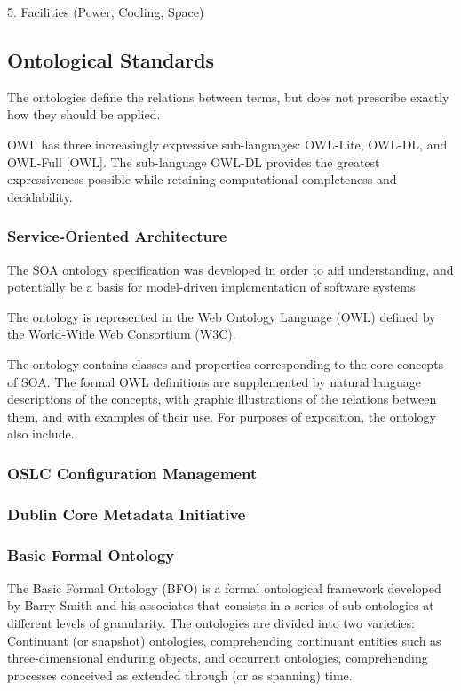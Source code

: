 5. Facilities (Power, Cooling, Space)

\subsection{Ontological Standards}

The ontologies define the relations between terms, but does not prescribe exactly how they should be applied. 

OWL has three increasingly expressive sub-languages: OWL-Lite, OWL-DL, and OWL-Full [OWL]. The sub-language OWL-DL provides the greatest expressiveness possible while retaining computational completeness and decidability.

\subsubsection{Service-Oriented Architecture}

The SOA ontology specification was developed in order to aid understanding, and potentially be a basis for model-driven implementation of software systems

The ontology is represented in the Web Ontology Language (OWL) defined by the World-Wide Web Consortium (W3C). 

The ontology contains classes and properties corresponding to the core concepts of SOA. The formal OWL definitions are supplemented by natural language descriptions of the concepts, with graphic illustrations of the relations between them, and with examples of their use. For purposes of exposition, the ontology also include.

\subsubsection{OSLC Configuration Management}


\subsubsection{Dublin Core Metadata Initiative}

\subsubsection{Basic Formal Ontology}

The Basic Formal Ontology (BFO) is a formal ontological framework developed by Barry Smith and his associates that consists in a series of sub-ontologies at different levels of granularity. The ontologies are divided into two varieties:
 Continuant (or snapshot) ontologies, comprehending continuant entities such as three-dimensional enduring objects, and occurrent ontologies, comprehending processes conceived as extended through (or as spanning) time.

